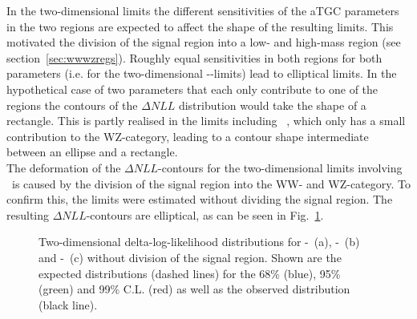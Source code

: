 In the two-dimensional limits the different sensitivities of the aTGC parameters in the two regions are expected to affect the shape of the resulting limits. This motivated the division of the signal region into a low- and high-mass region (see section~\ref{sec:wwwzregs}). Roughly equal sensitivities in both regions for both parameters (i.e. for the two-dimensional \Tcwww -\Tccw -limits) lead to elliptical limits. In the hypothetical case of two parameters that each only contribute to one of the regions the contours of the $\Delta NLL$ distribution would take the shape of a rectangle. This is partly realised in the limits including \Tcb \ , which only has a small contribution to the WZ-category, leading to a contour shape intermediate between an ellipse and a rectangle.\\

\noindent The deformation of the $\Delta NLL$-contours for the two-dimensional limits involving \Tcb \ is caused by the division of the signal region into the WW- and WZ-category. To confirm this, the limits were estimated without dividing the signal region. The resulting $\Delta NLL$-contours are elliptical, as can be seen in Fig.~\ref{fig:limits:2dlimits_nocat}.

\begin{figure}
	\centering
	\caption[Two-dimensional delta-log-likelihood distributions for the three combinations of aTGC parameters without division of the signal region]{Two-dimensional delta-log-likelihood distributions for \Tcwww -\Tccw \ (a), \Tcwww -\Tcb \ (b) and \Tccw -\Tcb\ (c) without division of the signal region. Shown are the expected distributions (dashed lines) for the 68\% (blue), 95\% (green) and 99\% C.L. (red) as well as the observed distribution (black line).}
	\label{fig:limits:2dlimits_nocat}	
\end{figure}
